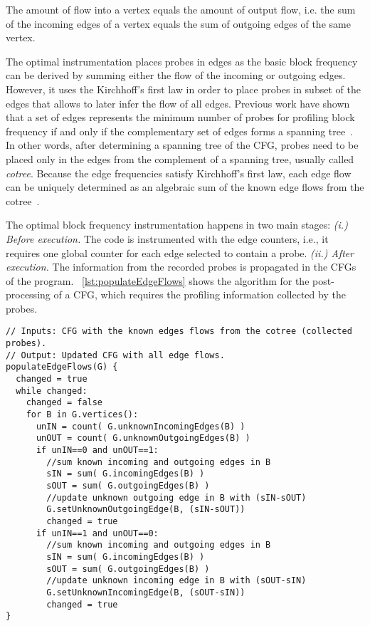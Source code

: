\begin{definition}
The amount of flow into a vertex equals the amount of output flow, i.e. the sum of the incoming edges of a vertex equals the sum of outgoing edges of the same vertex.
\end{definition}

The optimal instrumentation places probes in edges as the basic block frequency can be derived by summing either the flow of the incoming or outgoing edges.
However, it uses the Kirchhoff's first law in order to place probes in subset of the edges that allows to later infer the flow of all edges.
Previous work have shown that a set of edges represents the minimum number of probes for profiling block frequency if and only if the complementary set of edges forms a spanning tree~\citep{nahapetian73,ball94}.
In other words, after determining a spanning tree of the CFG, probes need to be placed only in the edges from the complement of a spanning tree, usually called \textit{cotree}.
Because the edge frequencies satisfy Kirchhoff's first law, each edge flow can be uniquely determined as an algebraic sum of the known edge flows from the cotree~\citep{nahapetian73,ball94}.

The optimal block frequency instrumentation happens in two main stages:
\textit{(i.) Before execution.} The code is instrumented with the edge counters, i.e., it requires one global counter for each edge selected to contain a probe.
\textit{(ii.) After execution.} The information from the recorded probes is propagated in the CFGs of the program.
\lstlistingname~\ref{lst:populateEdgeFlows} shows the algorithm for the post-processing of a CFG, which requires the profiling information collected by the probes.

\begin{lstlisting}[caption={Post-processing of the CFG for populating all edge flows based on the collected probes.}, label={lst:populateEdgeFlows}, float]
// Inputs: CFG with the known edges flows from the cotree (collected probes).
// Output: Updated CFG with all edge flows.
populateEdgeFlows(G) {
  changed = true
  while changed:
    changed = false
    for B in G.vertices():
      unIN = count( G.unknownIncomingEdges(B) )
      unOUT = count( G.unknownOutgoingEdges(B) )
      if unIN==0 and unOUT==1:
        //sum known incoming and outgoing edges in B
        sIN = sum( G.incomingEdges(B) )
        sOUT = sum( G.outgoingEdges(B) )
        //update unknown outgoing edge in B with (sIN-sOUT)
        G.setUnknownOutgoingEdge(B, (sIN-sOUT))
        changed = true
      if unIN==1 and unOUT==0:
        //sum known incoming and outgoing edges in B
        sIN = sum( G.incomingEdges(B) )
        sOUT = sum( G.outgoingEdges(B) )
        //update unknown incoming edge in B with (sOUT-sIN)
        G.setUnknownIncomingEdge(B, (sOUT-sIN))
        changed = true
}
\end{lstlisting}

